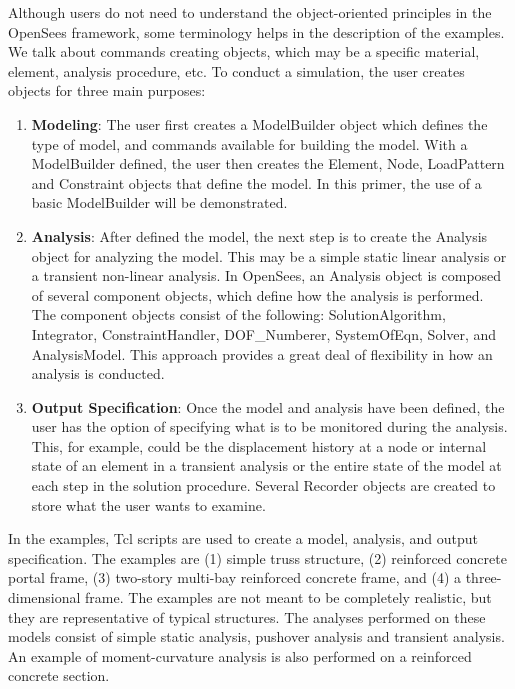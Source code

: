 \documentclass[12pt]{article}
\begin{document}
Although users do not need to understand the object-oriented
principles in the OpenSees framework, some terminology helps in the
description of the examples.  We talk about commands creating objects,
which may be a specific material, element, analysis procedure, etc.
To conduct a simulation, the user creates objects for three main purposes: 
\begin{enumerate}
\item {\bf Modeling}: The user first creates a ModelBuilder object which
   defines the type of model, and commands available for building the model.
   With a ModelBuilder defined, the user then creates the Element,
Node, LoadPattern and Constraint objects that define the model. In
this primer, the use of a basic ModelBuilder will be demonstrated.
\item {\bf Analysis}: After defined the model, the next step
is to create the Analysis object for analyzing the model. This
may be a simple static linear analysis or a transient
non-linear analysis. In OpenSees, an Analysis object is composed of
several component objects, which define how the analysis is
performed. The component objects consist of the following: {
SolutionAlgorithm}, {Integrator}, { ConstraintHandler}, { DOF\_Numberer}, {
SystemOfEqn}, { Solver}, and { AnalysisModel}. This approach provides
a great deal of flexibility in how an analysis is conducted. 
\item {\bf Output Specification}: Once the model and analysis have been 
defined, the user has the option of specifying what is to be
monitored during the analysis. This, for example, could be the
displacement history at a node or internal state of an element
in a transient analysis or the entire
state of the model at each step in the solution procedure. Several
Recorder objects are created to store what the user wants to examine.
\end{enumerate}


In the examples, Tcl scripts are used to create a model, analysis,
and output specification.
The examples are (1) simple truss structure, (2) reinforced
concrete portal frame, (3) two-story multi-bay reinforced concrete frame,
and (4) a three-dimensional frame.
The examples are not meant to be completely realistic, but they are
representative of typical structures. 
The analyses performed on these models consist of simple 
static analysis, pushover analysis and transient analysis. An example
of moment-curvature analysis is also performed on a reinforced
concrete section.
\end{document}
